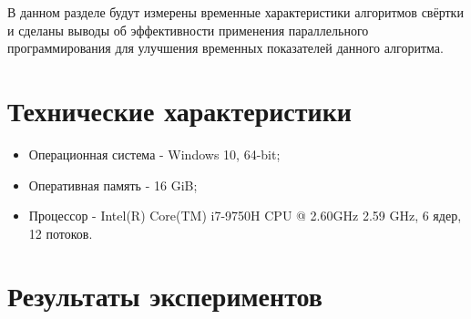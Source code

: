 В данном разделе будут измерены временные характеристики алгоритмов свёртки и сделаны выводы об эффективности применения параллельного программирования для улучшения временных показателей данного алгоритма.

\section{Технические характеристики}
\begin{itemize}
	\item Операционная система - Windows 10, 64-bit;
	\item Оперативная память - 16 GiB;
	\item Процессор - Intel(R) Core(TM) i7-9750H CPU @ 2.60GHz 2.59 GHz, 6 ядер, 12 потоков.
\end{itemize}

\section{Результаты экспериментов}

